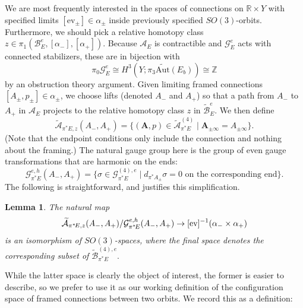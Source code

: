 \documentclass{memo-l}
\newcommand{\pE}{\pi^* \! E}
\newtheorem{lemma}[theorem]{Lemma}
\theoremstyle{definition}
\theoremstyle{remark}
\numberwithin{section}{chapter}
\numberwithin{equation}{chapter}
\begin{document}
\noindent We are most frequently interested in the spaces of connections on $\mathbb R \times Y$ with specified limits $[\text{ev}_{\pm}] \in \alpha_\pm$ inside previously specified $SO(3)$-orbits. Furthermore, we should pick a relative homotopy class $z \in \pi_1(\mathcal B^e_E, [\alpha_-], [\alpha_+])$. Because $\mathcal A_E$ is contractible and $\mathcal G^e_E$ acts with connected stabilizers, these are in bijection with $$\pi_0 \mathcal G^e_E \cong H^3(Y;\pi_3 \widetilde{\text{Aut}}(E_b)) \cong \mathbb Z$$ by an obstruction theory argument. Given limiting framed connections $[A_\pm,p_\pm] \in \alpha_\pm$, we choose lifts (denoted $A_-$ and $A_+$) so that a path from $A_-$ to $A_+$ in $\mathcal A_E$ projects to the relative homotopy class $z$ in $\widetilde{\mathcal B}^e_E$. We then define $$\widetilde{\mathcal A}_{\pE,z}(A_-, A_+) = \{(\mathbf{A},p) \in \widetilde{\mathcal A}^{(4)}_{\pE} \mid \mathbf{A}_{\pm \infty} = A_{\pm \infty}\}.$$ (Note that the endpoint conditions only include the connection and nothing about the framing.) The natural gauge group here is the group of even gauge transformations that are harmonic on the ends: $$\mathcal G^{e,h}_{\pE}(A_-, A_+) = \{\sigma \in \mathcal G^{(4),e}_{\pE} \mid d_{\pi^*A_{\pm}} \sigma = 0 \text{ on the corresponding end}\}.$$ The following is straightforward, and justifies this simplification. 

\begin{lemma}The natural map $$\widetilde{\mathcal A}_{\pE, z}(A_-, A_+)/\mathcal G^{e,h}_{\pE}(A_-, A_+) \to [\textup{ev}]^{-1}(\alpha_- \times \alpha_+)$$ is an isomorphism of $SO(3)$-spaces, where the final space denotes the corresponding subset of $\widetilde{\mathcal B}^{(4),e}_{\pE}.$ \end{lemma} 

While the latter space is clearly the object of interest, the former is easier to describe, so we prefer to use it as our working definition of the configuration space of framed connections between two orbits. We record this as a definition:
\end{document}
